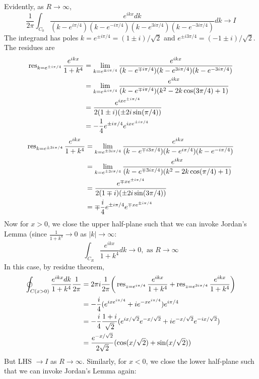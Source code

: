 \documentclass[a4paper]{article}
\begin{document}
\begin{ans}
\begin{center}
\begin{tikzpicture}
    \end{tikzpicture}
  \end{center}
Evidently, as $R\rightarrow\infty$,
$$\frac{1}{2\pi}\int_{C_0}\frac{e^{ikx}dk}{(k-e^{i\pi/4})(k-e^{-i\pi/4})(k-e^{3i\pi/4})(k-e^{-3i\pi/4})}dk\rightarrow I$$
The integrand has poles $k=e^{\pm i\pi/4}=(1\pm i)/\sqrt{2}$ and $e^{\pm i3\pi/4}=(-1\pm i)/\sqrt{2}$. The residues are
\begin{align}
    \res_{k=e^{\pm i\pi/4}}\frac{e^{ikx}}{1+k^4}&=\lim_{k=e^{\pm i\pi/4}}\frac{e^{ikx}}{(k-e^{\mp i\pi/4})(k-e^{3i\pi/4})(k-e^{-3i\pi/4})}\nonumber\\&=\lim_{k=e^{\pm i\pi/4}}\frac{e^{ikx}}{(k-e^{\mp i\pi/4})(k^2-2k\cos(3\pi/4)+1)}\nonumber\\&=\frac{e^{ixe^{\pm i\pi/4}}}{2(1\pm i)(\pm 2i\sin(\pi/4))}\nonumber\\&=-\frac{1}{4}e^{\pm i\pi/4}e^{ix e^{\pm i\pi/4}}\nonumber
\end{align}
\begin{align}
    \res_{k=e^{\pm 3i\pi/4}}\frac{e^{ikx}}{1+k^4}&=\lim_{k=e^{\pm 3i\pi/4}}\frac{e^{ikx}}{(k-e^{\mp i3\pi/4})(k-e^{i\pi/4})(k-e^{-i\pi/4})}\nonumber\\&=\lim_{k=e^{\pm 3i\pi/4}}\frac{e^{ikx}}{(k-e^{\mp 3i\pi/4})(k^2-2k\cos(\pi/4)+1)}\nonumber\\&=\frac{e^{\mp xe^{\pm i\pi/4}}}{2(1\mp i)(\pm 2i\sin(3\pi/4))}\nonumber\\&=\mp\frac{i}{4}e^{\pm i\pi/4}e^{\mp x e^{\pm i\pi/4}}\nonumber
\end{align}
Now for $x>0$, we close the upper half-plane such that we can invoke Jordan's Lemma (since $\frac{1}{1+k^4}\rightarrow 0$ as $|k|\rightarrow\infty$:
$$\int_{C_R}\frac{e^{ikx}}{1+k^4}dk\rightarrow0, \text{ as }R\rightarrow\infty$$
In this case, by residue theorem,
\begin{align}
\oint_{C(x>0)}\frac{e^{ikx}dk}{1+k^4}\frac{1}{2\pi}&=2\pi i\frac{1}{2\pi}\bigg(\res_{z=e^{i\pi/4}}\frac{e^{ikx}}{1+k^4}+\res_{z=e^{3i\pi/4}}\frac{e^{ikx}}{1+k^4}\bigg)\nonumber\\&=-\frac{i}{4}(e^{ixe^{i\pi/4}}+ie^{-xe^{i\pi/4}})e^{i\pi/4}\nonumber\\&=-\frac{i}{4}\frac{1+i}{\sqrt{2}}(e^{ix/\sqrt{2}}e^{-x/\sqrt{2}}+ie^{-x/\sqrt{2}}e^{-ix/\sqrt{2}})\nonumber\\&=\frac{e^{-x/\sqrt{2}}}{2\sqrt{2}}(\cos(x/\sqrt{2})+\sin(x/\sqrt{2}))\nonumber
\end{align}
But LHS $\rightarrow I$ as $R\rightarrow\infty$. Similarly, for $x<0$, we close the lower half-plane such that we can invoke Jordan's Lemma again:

\end{ans}
\end{document}
